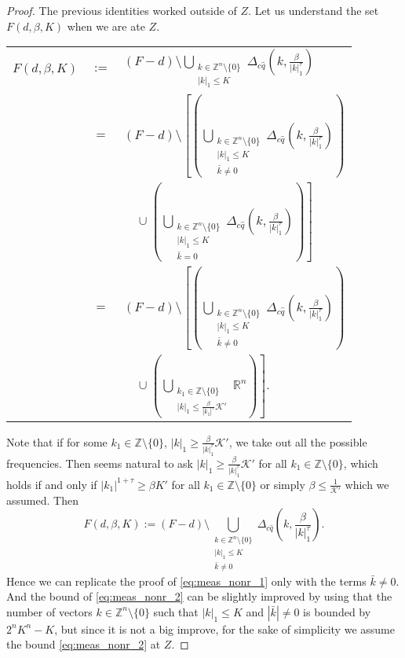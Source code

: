 \begin{proof}
The previous identities worked outside of $Z$. Let us understand the set $F(d,\beta,K)$ when we are ate $Z$.
\begin{longtable}{rcl}
$F(d,\beta,K)$ & $:=$ & $(F-d)\setminus \bigcup_{\substack{k\in\mathbb{Z}^n\setminus\{0\} \\ |k|_1 \leq K}} \Delta_{c\hat q}(k,\frac{\beta}{|k|_1^\tau})$ \\
 & $=$ & $(F-d)\setminus \left[\left(\bigcup_{\substack{k\in\mathbb{Z}^n\setminus\{0\} \\ |k|_1 \leq K \\ \bar k \neq 0}} \Delta_{c\hat q}(k,\frac{\beta}{|k|_1^\tau})\right) \right. $\\
 & & $\quad \cup \left. \left(\bigcup_{\substack{k\in\mathbb{Z}^n\setminus\{0\} \\ |k|_1 \leq K \\ \bar k = 0}} \Delta_{c\hat q}(k,\frac{\beta}{|k|_1^\tau})\right)\right]$ \\
 & $=$ & $(F-d)\setminus \left[\left(\bigcup_{\substack{k\in\mathbb{Z}^n\setminus\{0\} \\ |k|_1 \leq K \\ \bar k \neq 0}} \Delta_{c\hat q}(k,\frac{\beta}{|k|_1^\tau})\right)  \right. $\\
 & & $\quad \cup \left. \left(\bigcup_{\substack{k_1\in\mathbb{Z}\setminus\{0\} \\ |k|_1 \leq \frac{\beta}{|k_1|^\tau}\mathcal{K}'} } \mathbb{R}^n \right)\right]$.\\
\end{longtable}
Note that if for some $k_1 \in \mathbb{Z}\setminus \{0\}$, $|k|_1 \geq \frac{\beta}{|k|_1^\tau}\mathcal{K}'$, we take out all the possible frequencies.
Then seems natural to ask $|k|_1 \geq \frac{\beta}{|k|_1^\tau}\mathcal{K}'$ for all $k_1 \in \mathbb{Z}\setminus\{0\}$, which holds if and only if $|k_1|^{1+\tau} \geq \beta K'$ for all $k_1 \in \mathbb{Z}\setminus\{0\}$ or simply $\beta\leq \frac{1}{\mathcal{K}'}$ which we assumed. Then
$$F(d,\beta,K) := (F-d)\setminus \bigcup_{\substack{k\in\mathbb{Z}^n\setminus\{0\} \\ |k|_1 \leq K \\ \bar k \neq 0}} \Delta_{c\hat q}(k,\frac{\beta}{|k|_1^\tau}).$$
Hence we can replicate the proof of \ref{eq:meas_nonr_1} only with the terms $\bar k \neq 0$. And the bound of \ref{eq:meas_nonr_2} can be slightly improved by using that the number of vectors $k\in \mathbb{Z}^n\setminus\{0\}$ such that $|k|_1 \leq K$ and $|\bar k| \neq 0$ is bounded by $2^n K^n - K$, but since it is not a big improve, for the sake of simplicity we assume the bound \ref{eq:meas_nonr_2} at $Z$.


\end{proof}


